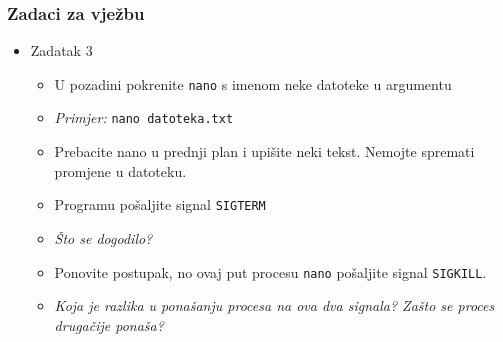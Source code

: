 \documentclass[table,usenames,dvipsnames]{beamer}
\newcommand{\shell}[1]{\texttt{#1}}
\begin{document}
\begin{frame}[t]
	\frametitle{Zadaci za vježbu}
	\begin{itemize}
		\item Zadatak 3
		\begin{itemize}
			\item U pozadini pokrenite \shell{nano} s imenom neke datoteke u argumentu
			\item[] \emph{Primjer:} \shell{nano datoteka.txt}
			\item Prebacite nano u prednji plan i upišite neki tekst. Nemojte spremati promjene u datoteku.
			\item Programu pošaljite signal \shell{SIGTERM}
			\item[] \emph{Što se dogodilo?}
			\item Ponovite postupak, no ovaj put procesu \shell{nano} pošaljite signal \shell{SIGKILL}.
			\item[] \emph{Koja je razlika u ponašanju procesa na ova dva signala? Zašto se proces drugačije ponaša?}
		\end{itemize}
	\end{itemize}
\end{frame}
\end{document}
